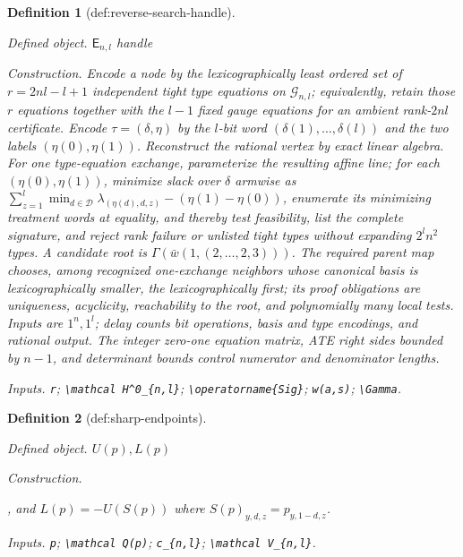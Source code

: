 \documentclass{article}
\newtheorem{definition}{Definition}
\begin{document}
\begin{definition}[def:reverse-search-handle]\label{def:reverse-search-handle}
\par\smallskip\noindent\emph{Defined object.} \(\mathsf E_{n,l}\) handle
\par\smallskip\noindent\emph{Construction.} Encode a node by the lexicographically least ordered set of \(r=2nl-l+1\) independent tight type equations on \(\mathcal G_{n,l}\); equivalently, retain those \(r\) equations together with the \(l-1\) fixed gauge equations for an ambient rank-\(2nl\) certificate. Encode \(\tau=(\delta,\eta)\) by the \(l\)-bit word \((\delta(1),\ldots,\delta(l))\) and the two labels \((\eta(0),\eta(1))\). Reconstruct the rational vertex by exact linear algebra. For one type-equation exchange, parameterize the resulting affine line; for each \((\eta(0),\eta(1))\), minimize slack over \(\delta\) armwise as \(\sum_{z=1}^l\min_{d\in\mathcal D}\lambda_{(\eta(d),d,z)}-(\eta(1)-\eta(0))\), enumerate its minimizing treatment words at equality, and thereby test feasibility, list the complete signature, and reject rank failure or unlisted tight types without expanding \(2^l n^2\) types. A candidate root is \(\Gamma(\bar w(1,(2,\ldots,2,3)))\). The required parent map chooses, among recognized one-exchange neighbors whose canonical basis is lexicographically smaller, the lexicographically first; its proof obligations are uniqueness, acyclicity, reachability to the root, and polynomially many local tests. Inputs are \(1^n,1^l\); delay counts bit operations, basis and type encodings, and rational output. The integer zero-one equation matrix, ATE right sides bounded by \(n-1\), and determinant bounds control numerator and denominator lengths.
\par\smallskip\noindent\emph{Inputs.} \texttt{r}; \texttt{\textbackslash{}\allowbreak{}mathcal H\textasciicircum{}0\_\allowbreak{}\{n,\allowbreak{}l\}\allowbreak{}}; \texttt{\textbackslash{}\allowbreak{}operatorname\{Sig\}\allowbreak{}}; \texttt{w(a,\allowbreak{}s)}; \texttt{\textbackslash{}\allowbreak{}Gamma}.
\end{definition}

\begin{definition}[def:sharp-endpoints]\label{def:sharp-endpoints}
\par\smallskip\noindent\emph{Defined object.} \(U(p),L(p)\)
\par\smallskip\noindent\emph{Construction.} \par\noindent {}\par\noindent, and \(L(p)=-U(S(p))\) where \(S(p)_{y,d,z}=p_{y,1-d,z}\).
\par\smallskip\noindent\emph{Inputs.} \texttt{p}; \texttt{\textbackslash{}\allowbreak{}mathcal Q(p)}; \texttt{c\_\allowbreak{}\{n,\allowbreak{}l\}\allowbreak{}}; \texttt{\textbackslash{}\allowbreak{}mathcal V\_\allowbreak{}\{n,\allowbreak{}l\}\allowbreak{}}.
\end{definition}
\end{document}
